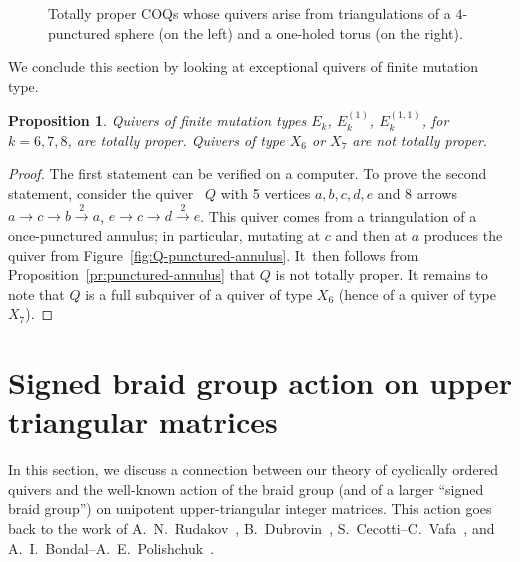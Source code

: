 \documentclass[11pt, letterpaper]{amsart}
\newtheorem{proposition}[theorem]{Proposition}
\theoremstyle{definition}
\numberwithin{equation}{section}
\begin{document}
\begin{figure}[ht]
{
} %
\caption{
Totally proper COQs whose quivers arise from triangulations of a $4$-punctured sphere (on the left)
and a one-holed torus (on the right). 
}
\vspace{-10pt}
\label{fig:4 punctured sphere}
\end{figure}

We conclude this section by looking at exceptional quivers of finite mutation type. 

\begin{proposition}
\label{pr:exceptional-11}
Quivers of finite mutation types $E_k$, $E_k^{(1)}$, $E_k^{(1,1)}$, for $k=6,7,8$, are totally proper. 
Quivers of type $X_6$ or $X_7$ are not totally proper. 
\end{proposition}

\begin{proof}
The first statement can be verified on a computer. To prove the second statement, consider the quiver ~$Q$ 
with 5 vertices $a, b, c, d, e$ and 8 arrows $a\to c \to b\stackrel{2}{\longrightarrow} a$, $e\to c\to d\stackrel{2}{\longrightarrow} e$. 
This quiver comes from a triangulation of a once-punctured annulus; in particular, mutating at $c$ and then at $a$ produces the quiver from Figure~\ref{fig:Q-punctured-annulus}. 
It~then follows from Proposition~\ref{pr:punctured-annulus} that $Q$ is not totally proper.
It remains to note that $Q$ is a full subquiver of a quiver of type $X_6$ (hence of a quiver of type~$X_7$). 
\end{proof}

\newpage 


\section{Signed braid group action on upper triangular matrices} 
\label{sec:bondal}

In this section, we discuss a connection between our theory of cyclically ordered quivers 
and the well-known action of the braid group (and of a larger ``signed braid group'') 
on unipotent upper-triangular integer matrices. 
This action goes back to the work of A.~N.~Rudakov~\cite{Rudakov},
B.~Dubrovin~\cite[App.~F]{Dub},
S.~Cecotti--C.~Vafa~\cite[p.~605]{CV},
and A.~I.~Bondal--A.~E.~Polishchuk~\cite{BP}. 
\end{document}
